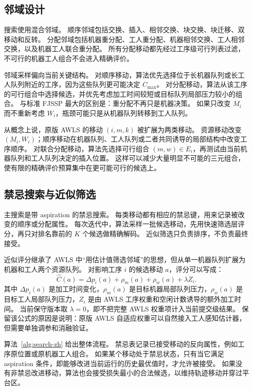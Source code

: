 \documentclass[UTF8,a4paper,zihao=-4]{ctexart}
\begin{document}
\subsection{邻域设计}
搜索使用混合邻域。
顺序邻域包括交换、插入、相邻交换、块交换、块迁移、双移动和反转。
分配邻域包括机器重分配、工人重分配、机器相邻交换、工人相邻交换，以及机器工人联合重分配。
所有分配移动都先经过工序级可行列表过滤，不可行的机器工人组合不会进入精确评价。

邻域采样偏向当前关键结构。
对顺序移动，算法优先选择位于长机器队列或长工人队列附近的工序，因为这些队列更可能决定 $C_{\max}$。
对分配移动，算法从该工序的可行组合中选择候选，并优先考虑加工时间较短或目标队列局部压力较小的组合。
与标准 FJSSP 最大的区别是：重分配不再只是机器决策。
如果只改变 $M_i$ 而不重新考虑 $W_i$，瓶颈可能只是从机器队列转移到工人队列。

从概念上说，原版 AWLS 的移动 $(i,m,k)$ 被扩展为两类移动。
资源移动改变 $(M_i,W_i)$；顺序移动在机器队列、工人队列或二者共同诱导的局部结构中改变工序顺序。
对联合分配移动，算法先选择可行组合 $(m,w)\in E_i$，再测试由当前机器队列和工人队列决定的插入位置。
这样可以减少大量明显不可能的三元组合，使有限的精确评价预算集中在更可能可行的候选上。

\subsection{禁忌搜索与近似筛选}
主搜索是带 aspiration 的禁忌搜索。
每类移动都有相应的禁忌键，用来记录被改变的顺序或分配属性。
每次迭代中，算法采样一批候选移动，先用快速筛选层评分，再只对排名靠前的 $K$ 个候选做精确解码。
近似筛选只负责排序，不负责最终接受。

近似评分继承了 AWLS 中“用估计值筛选邻域”的思想，但从单一机器队列扩展为机器和工人两个资源队列。
对影响工序 $i$ 的候选移动 $a$，评分可以写成：
\[
  \hat{C}(a)=\Delta p_i(a)+\rho_m(a)+\rho_w(a)+\lambda Z_i .
\]
其中 $\Delta p_i(a)$ 是加工时间变化，$\rho_m(a)$ 是目标机器局部队列压力，$\rho_w(a)$ 是目标工人局部队列压力，$Z_i$ 是由 AWLS 工序权重和空闲计数诱导的额外加工时间。
当前保守版本取 $\lambda=0$，即不把完整 AWLS 权重项计入当前提交级结果。
保留该公式的原因是说明：原版 AWLS 自适应权重可以自然接入工人感知估计器，但需要单独调参和消融验证。

算法~\ref{alg:search-zh} 给出整体流程。
禁忌表记录已接受移动的反向属性，例如工序原位置或原机器工人组合。
如果某个移动处于禁忌状态，只有当它满足 aspiration 条件，即能够改进当前运行的历史最优值时，才允许被接受。
如果没有非禁忌改进移动，算法也会接受损失最小的合法候选，以维持轨迹移动并穿过平台区。
\end{document}
